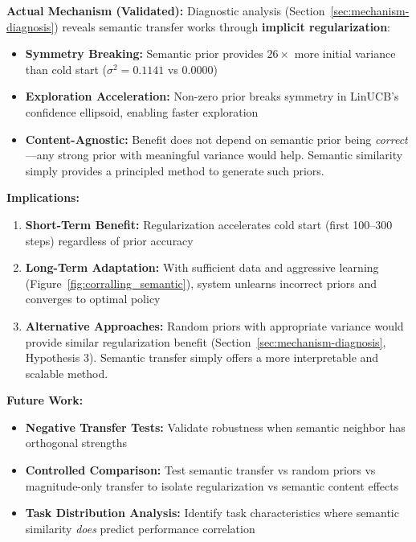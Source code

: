 \textbf{Actual Mechanism (Validated):} Diagnostic analysis (Section~\ref{sec:mechanism-diagnosis}) reveals semantic transfer works through \textbf{implicit regularization}:
\begin{itemize}
    \item \textbf{Symmetry Breaking:} Semantic prior provides $26\times$ more initial variance than cold start ($\sigma^2 = 0.1141$ vs $0.0000$)
    \item \textbf{Exploration Acceleration:} Non-zero prior breaks symmetry in LinUCB's confidence ellipsoid, enabling faster exploration
    \item \textbf{Content-Agnostic:} Benefit does not depend on semantic prior being \emph{correct}—any strong prior with meaningful variance would help. Semantic similarity simply provides a principled method to generate such priors.
\end{itemize}

\textbf{Implications:}
\begin{enumerate}
    \item \textbf{Short-Term Benefit:} Regularization accelerates cold start (first 100--300 steps) regardless of prior accuracy
    \item \textbf{Long-Term Adaptation:} With sufficient data and aggressive learning (Figure~\ref{fig:corralling_semantic}), system unlearns incorrect priors and converges to optimal policy
    \item \textbf{Alternative Approaches:} Random priors with appropriate variance would provide similar regularization benefit (Section~\ref{sec:mechanism-diagnosis}, Hypothesis 3). Semantic transfer simply offers a more interpretable and scalable method.
\end{enumerate}

\textbf{Future Work:}
\begin{itemize}
    \item \textbf{Negative Transfer Tests:} Validate robustness when semantic neighbor has orthogonal strengths
    \item \textbf{Controlled Comparison:} Test semantic transfer vs random priors vs magnitude-only transfer to isolate regularization vs semantic content effects
    \item \textbf{Task Distribution Analysis:} Identify task characteristics where semantic similarity \emph{does} predict performance correlation
\end{itemize}
